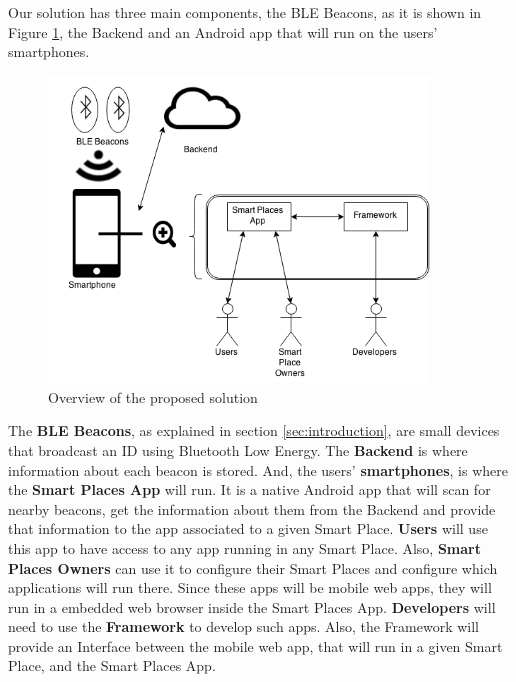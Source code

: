 Our solution has three main components,
the BLE Beacons, as it is shown in Figure 
\ref{fig:overview_architecture}, 
the Backend and an Android app
that will run on the users' smartphones.
\begin{figure}[!ht]
  \centering
    \includegraphics[width=0.9\textwidth]{img/overview_architecture}
    \caption{Overview of the proposed solution}
    \label{fig:overview_architecture}
\end{figure}
The \textbf{BLE Beacons}, as explained in section 
\ref{sec:introduction}, are small devices that broadcast
an ID using Bluetooth Low Energy. The \textbf{Backend} is where information about each beacon is stored. 
And, the users'
\textbf{smartphones}, is where the 
\textbf{Smart Places App} will run.
It is a native Android app that will scan for 
nearby beacons,
get the information about them from the Backend and
provide that information to the app associated to a 
given Smart Place.
\textbf{Users} will use this app to have access
to any app running in any Smart Place.
Also, \textbf{Smart Places Owners} can use it to configure
their Smart Places and configure which applications
will run there.
Since these apps will be mobile web apps, they will run
in a embedded web browser inside the Smart Places App.
\textbf{Developers} will need to use the \textbf{Framework} to
develop such apps. Also, the Framework will provide an
Interface between the mobile web app, that will run
in a given Smart Place, and the Smart Places App.

